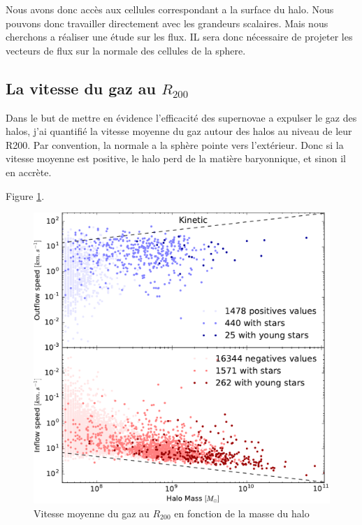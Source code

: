 Nous avons donc accès aux cellules correspondant a la surface du halo.
Nous pouvons donc travailler directement avec les grandeurs scalaires.
Mais nous cherchons a réaliser une étude sur les flux.
IL sera donc nécessaire de projeter les vecteurs de flux sur la normale des cellules de la sphere.





\subsection{La vitesse du gaz au $R_{200}$}

Dans le but de mettre en évidence l'efficacité des supernovae a expulser le gaz des halos, j'ai quantifié la vitesse moyenne du gaz autour des halos au niveau de leur R200.
Par convention, la normale a la sphère pointe vers l'extérieur.
Donc si la vitesse moyenne est positive, le halo perd de la matière baryonnique, et sinon il en accrète.



Figure \ref{fig:R200speed}.

\begin{figure}
        \includegraphics[width=.95\linewidth]{img/03/flux_speed_kinetic.pdf} 
        \caption{Vitesse moyenne du gaz au $R_{200}$ en fonction de la masse du halo}
 		\label{fig:R200speed}
\end{figure}




